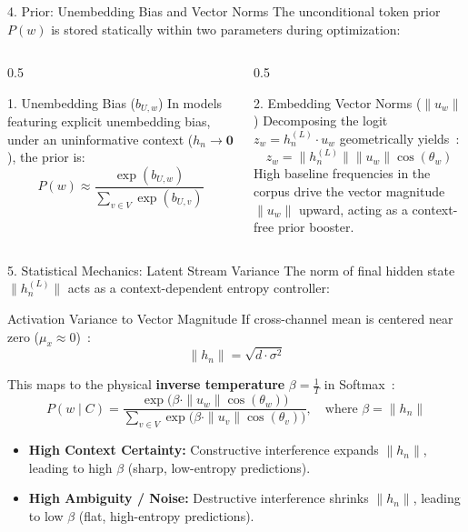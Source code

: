 \documentclass[aspectratio=169, 11pt]{beamer}
\begin{document}
\begin{frame}{4. Prior: Unembedding Bias and Vector Norms}
    The unconditional token prior $P(w)$ is stored statically within two parameters during optimization:
    \begin{columns}[T]
        \begin{column}{0.5\textwidth}
            \begin{block}{1. Unembedding Bias ($b_{U,w}$)}
                In models featuring explicit unembedding bias, under an uninformative context ($h_n \to \mathbf{0}$), the prior is:
                $$P(w) \approx \frac{\exp(b_{U,w})}{\sum_{v \in V} \exp(b_{U,v})}$$
            \end{block}
        \end{column}
        \begin{column}{0.5\textwidth}
            \begin{block}{2. Embedding Vector Norms ($\|u_w\|$)}
                Decomposing the logit $z_w = h_n^{(L)} \cdot u_w$ geometrically yields~\cite{gao2019representation}:
                $$z_w = \|h_n^{(L)}\| \|u_w\| \cos(\theta_w)$$
                High baseline frequencies in the corpus drive the vector magnitude $\|u_w\|$ upward, acting as a context-free prior booster.
            \end{block}
        \end{column}
    \end{columns}
\end{frame}

\begin{frame}{5. Statistical Mechanics: Latent Stream Variance}
    The norm of final hidden state $\|h_n^{(L)}\|$ acts as a context-dependent entropy controller:
    \begin{block}{Activation Variance to Vector Magnitude}
        If cross-channel mean is centered near zero ($\mu_x \approx 0$)~\cite{ba2016layernorm}:
        $$\|h_n\| = \sqrt{d \cdot \sigma^2}$$
    \end{block}
    This maps to the physical \textbf{inverse temperature} $\beta = \frac{1}{T}$ in Softmax~\cite{jaynes1957, ackley1985learning}:
    $$P(w \mid C) = \frac{\exp\big(\beta \cdot \|u_w\| \cos(\theta_w)\big)}{\sum_{v \in V} \exp\big(\beta \cdot \|u_v\| \cos(\theta_v)\big)}, \quad \text{where } \beta = \|h_n\|$$
    
    \begin{itemize}
        \item \color{accentgreen} \textbf{High Context Certainty:} \color{textdark} Constructive interference expands $\|h_n\|$, leading to high $\beta$ (sharp, low-entropy predictions).
        \item \color{accentpink} \textbf{High Ambiguity / Noise:} \color{textdark} Destructive interference shrinks $\|h_n\|$, leading to low $\beta$ (flat, high-entropy predictions).
    \end{itemize}
\end{frame}
\end{document}
